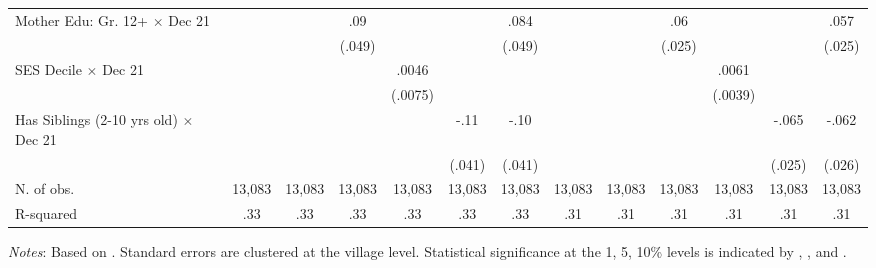 \begin{table}[H]
{\begin{tabular}{lcccccccccccc}
Mother Edu: Gr. 12+ $\times$ Dec 21&                     &                     &         .09\sym{*}  &                     &                     &        .084\sym{*}  &                     &                     &         .06\sym{**} &                     &                     &        .057\sym{**} \\
                    &                     &                     &      (.049)         &                     &                     &      (.049)         &                     &                     &      (.025)         &                     &                     &      (.025)         \\
SES Decile $\times$ Dec 21&                     &                     &                     &       .0046         &                     &                     &                     &                     &                     &       .0061         &                     &                     \\
                    &                     &                     &                     &     (.0075)         &                     &                     &                     &                     &                     &     (.0039)         &                     &                     \\
Has Siblings (2-10 yrs old)     $\times$ Dec 21&                     &                     &                     &                     &        -.11\sym{**} &         -.10\sym{**} &                     &                     &                     &                     &       -.065\sym{**} &       -.062\sym{**} \\
                    &                     &                     &                     &                     &      (.041)         &      (.041)         &                     &                     &                     &                     &      (.025)         &      (.026)         \\
N. of obs.          &      13,083         &      13,083         &      13,083         &      13,083         &      13,083         &      13,083         &      13,083         &      13,083         &      13,083         &      13,083         &      13,083         &      13,083         \\
R-squared           &         .33         &         .33         &         .33         &         .33         &         .33         &         .33         &         .31         &         .31         &         .31         &         .31         &         .31         &         .31         \\
\bottomrule
\end{tabular}
}

\begin{minipage}{1\linewidth}
\footnotesize
\textit{Notes}: {\tiny Based on \cite{singh_covid-19_2022}. Standard errors are clustered at the village level. Statistical significance at the 1, 5, 10\% levels is indicated by \sym{***}, \sym{**}, and \sym{*}.}
\end{minipage}
\end{table}
\endgroup
